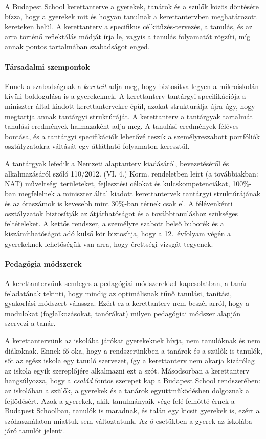 A Budapest School kerettanterve a gyerekek, tanárok és a szülők közös döntésére bízza, hogy a gyerekek mit és hogyan tanulnak a kerettantervben meghatározott kereteken belül. A kerettanterv a specifikus célkitűzés-tervezés, a tanulás, és az arra történő reflektálás módját írja le, vagyis a tanulás folyamatát rögzíti, míg annak pontos tartalmában szabadságot enged.

\paragraph{Társadalmi szempontok}  Ennek a szabadságnak
a \emph{kereteit} adja\linebreak
meg, hogy biztosítva legyen a mikroiskolán kívüli boldogulása is a gyerekeknek. A kerettanterv
 tantárgyi specifikációja a miniszter által kiadott kerettantervekre \citep{ofi:kerettanterv} épül, azokat strukturálja újra úgy, hogy megtartja annak tantárgyi struktúráját. A kerettanterv a tantárgyak tartalmát tanulási eredmények halmazaként adja meg. A tanulási eredmények féléves bontása, és a tantárgyi specifikációk lehetővé teszik a személyreszabott portfóliók osztályzatokra váltását egy átlátható folyamaton keresztül.

A tantárgyak lefedik a Nemzeti alaptanterv kiadásáról, bevezetéséről és alkalmazásáról szóló 110/2012. (VI. 4.) Korm. rendeletben leírt (a továbbiakban: NAT) műveltségi területeket, fejlesztési célokat és kulcskompetenciákat, 100\%-ban megfelelnek a miniszter által kiadott kerettantervek tantárgyi struktúrájának és az óraszámok is kevesebb mint 30\%-ban térnek csak el. A félévenkénti osztályzatok biztosítják az átjárhatóságot és a továbbtanuláshoz szükséges feltételeket. A kettős rendszer, a személyre szabott belső buborék és a kiszámíthatóságot adó külső kör biztosítja, hogy a 12.~évfolyam végén a gyerekeknek lehetőségük van arra, hogy érettségi vizsgát tegyenek.

\paragraph{Pedagógia módszerek}
A kerettantervünk semleges a pedagógiai módszerekkel kapcsolatban, a tanár feladatának tekinti, hogy mindig az optimálisnak tűnő tanulási, tanítási, gyakorlási módszert válassza. Ezért ez a kerettanterv nem beszél arról, hogy a modulokat (foglalkozásokat, tanórákat) milyen pedagógiai módszer alapján szervezi a tanár.

A kerettantervünk az iskolába járókat gyerekeknek hívja, nem tanulóknak és nem diákoknak. Ennek fő oka, hogy a rendszerünkben a tanárok és a szülők is tanulók, sőt az egész iskola egy tanuló szervezet, így a kerettanterv nem akarja  kizárólag az iskola egyik szereplőjére alkalmazni ezt a szót. Másodsorban a kerettanterv hangsúlyozza, hogy a \emph{család} fontos szerepet kap a Budapest School rendszerében: az iskolában a szülők, a gyerekek és a tanárok együttműködésben dolgoznak a fejlődésért. Azok a gyerekek, akik tanulmányaik vége felé felnőtté érnek a Budapest Schoolban, tanulók is maradnak, és talán egy kicsit gyerekek is, ezért a szóhasználaton miattuk sem változtatunk. Az ő esetükben a gyerek az iskolába járó tanulót jelenti.


